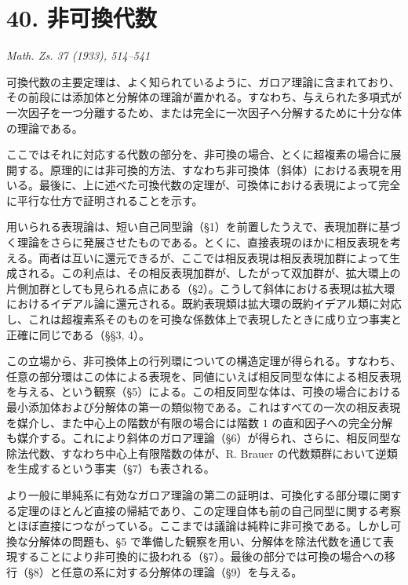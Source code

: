 \clearpage
\section*{40. 非可換代数}

\begin{center}
\emph{Math. Zs. 37 (1933), 514--541}
\end{center}

可換代数の主要定理は、よく知られているように、ガロア理論に含まれており、その前段には添加体と分解体の理論が置かれる。すなわち、与えられた多項式が一次因子を一つ分離するため、または完全に一次因子へ分解するために十分な体の理論である。

ここではそれに対応する代数の部分を、非可換の場合、とくに超複素の場合に展開する。原理的には非可換的方法、すなわち非可換体（斜体）における表現を用いる。最後に、上に述べた可換代数の定理が、可換体における表現によって完全に平行な仕方で証明されることを示す。

用いられる表現論は、短い自己同型論（§1）を前置したうえで、表現加群に基づく理論をさらに発展させたものである。とくに、直接表現のほかに相反表現を考える。両者は互いに還元できるが、ここでは相反表現は相反表現加群によって生成される。この利点は、その相反表現加群が、したがって双加群が、拡大環上の片側加群としても見られる点にある（§2）。こうして斜体における表現は拡大環におけるイデアル論に還元される。既約表現類は拡大環の既約イデアル類に対応し、これは超複素系そのものを可換な係数体上で表現したときに成り立つ事実と正確に同じである（§§3, 4）。

この立場から、非可換体上の行列環についての構造定理が得られる。すなわち、任意の部分環はこの体による表現を、同値にいえば相反同型な体による相反表現を与える、という観察（§5）による。この相反同型な体は、可換の場合における最小添加体および分解体の第一の類似物である。これはすべての一次の相反表現を媒介し、また中心上の階数が有限の場合には階数 \(1\) の直和因子への完全分解も媒介する。これにより斜体のガロア理論（§6）が得られ、さらに、相反同型な除法代数、すなわち中心上有限階数の体が、R. Brauer の代数類群において逆類を生成するという事実（§7）も表される。

より一般に単純系に有効なガロア理論の第二の証明は、可換化する部分環に関する定理のほとんど直接の帰結であり、この定理自体も前の自己同型に関する考察とほぼ直接につながっている。ここまでは議論は純粋に非可換である。しかし可換な分解体の問題も、§5 で準備した観察を用い、分解体を除法代数を通じて表現することにより非可換的に扱われる（§7）。最後の部分では可換の場合への移行（§8）と任意の系に対する分解体の理論（§9）を与える。

